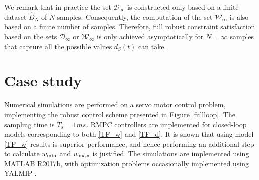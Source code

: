 \documentclass[letterpaper, 10 pt, conference]{ieeeconf}  %
\begin{document}
We remark that in practice the set $\mathcal{D}_{\infty}$ is constructed only based on a finite dataset $\hat{D}_{N}$ of $N$ samples. Consequently, the computation of the set $\mathcal{W}_{\infty}$ is also based  on a finite number of samples. Therefore, full robust
constraint satisfaction based on the sets $\mathcal{D}_{\infty}$ or $\mathcal{W}_{\infty}$
is only achieved asymptotically for $N=\infty$ samples
that capture all the possible values $d_S(t)$ can take.

\section{Case study}
	Numerical simulations are performed on a servo motor control problem, implementing the robust control scheme presented in Figure \ref{fullloop}. The sampling time is $T_s = 1 ms$. RMPC controllers are implemented for closed-loop models corresponding to both \eqref{TF_w} and \eqref{TF_d}. It is shown that using model \eqref{TF_w} results is superior performance, and hence performing an additional step to calculate $w_{\rm min}$ and $w_{\rm max}$ is justified.
	The simulations are implemented using MATLAB R2017b, with optimization problems occasionally implemented using YALMIP \cite{Lofberg2004}.
	\label{Case studies}
	\iffalse
\end{document}
